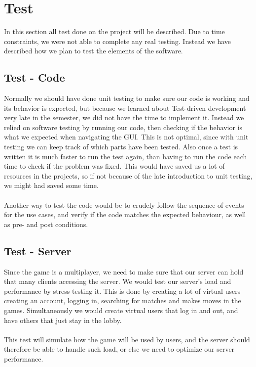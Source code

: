 
\section{Test}
	In this section all test done on the project will be described.
  Due to time constraints, we were not able to complete any real testing.
   Instead we have described how we plan to test the elements of the software.
		\subsection{Test - Code}
Normally we should have done unit testing to make sure our code is working
 and its behavior is expected, but because we learned about Test-driven
 development very late in the semester, we did not have the time to implement
 it. Instead we relied on software testing by running our code, then checking
  if the behavior is what we expected when navigating the GUI. This is not
  optimal, since with unit testing we can keep track of which parts have been
   tested. Also once a test is written it is much faster to run the test again,
    than having to run the code each time to check if the problem was fixed.
    This would have saved us a lot of resources in the projects, so if not
    because of the late introduction to unit testing, we might had saved
    some time.
\\
\\
Another way to test the code would be to crudely follow the sequence of events
 for the use cases, and verify if the code matches the expected behaviour,
  as well as pre- and post conditions.
		\subsection{Test - Server}
Since the game is a multiplayer, we need to make sure that our server can
 hold that many clients accessing the server. We would test our server’s load
 and performance by stress testing it. This is done by creating a lot of
  virtual users creating an account, logging in, searching for matches and
  makes moves in the games. Simultaneously we would create virtual users
  that log in and out, and have others that just stay in the lobby.
\\
\\
This test will simulate how the game will be used by users, and the server
 should therefore be able to handle such load, or else we need to optimize
  our server performance.
